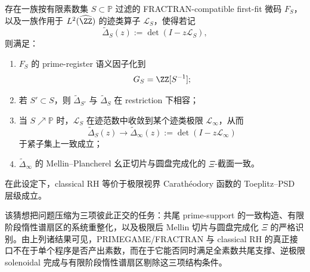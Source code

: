 \begin{conjecture}\label{conj:xi-time-part62ae-cofinal-primegame-xi-limit}
存在一族按有限素数集 \(S\subset\mathbb P\) 过滤的 FRACTRAN-compatible first-fit 微码 \(F_S\)，以及一族作用于 \(L^2(\widehat{\ZZ})\) 的迹类算子 \(\mathcal L_S\)，使得若记
\[
\widetilde\Delta_S(z):=\det(I-z\mathcal L_S),
\]
则满足：
\begin{enumerate}
  \item \(F_S\) 的 prime-register 语义因子化到
  \[
  G_S=\ZZ[S^{-1}];
  \]
  \item 若 \(S'\subset S\)，则 \(\widetilde\Delta_{S'}\) 与 \(\widetilde\Delta_S\) 在 restriction 下相容；
  \item 当 \(S\nearrow \mathbb P\) 时，\(\mathcal L_S\) 在迹范数中收敛到某个迹类极限 \(\mathcal L_\infty\)，从而
  \[
  \widetilde\Delta_S(z)\longrightarrow
  \widetilde\Delta_\infty(z):=\det(I-z\mathcal L_\infty)
  \]
  于紧子集上一致成立；
  \item \(\widetilde\Delta_\infty\) 的 Mellin--Plancherel 幺正切片与圆盘完成化的 \(\Xi\)-截面一致。
\end{enumerate}
在此设定下，classical RH 等价于极限视界 Carath\'eodory 函数的 Toeplitz--PSD 层级成立。
\end{conjecture}

该猜想把问题压缩为三项彼此正交的任务：共尾 prime-support 的一致构造、有限阶段惰性谱扇区的系统重整化，以及极限后 Mellin 切片与圆盘完成化 \(\Xi\) 的严格识别。由上列诸结果可见，PRIMEGAME/FRACTRAN 与 classical RH 的真正接口不在于单个程序是否产出素数，而在于它能否同时满足全素数共尾支撑、逆极限 solenoidal 完成与有限阶段惰性谱扇区剔除这三项结构条件。
